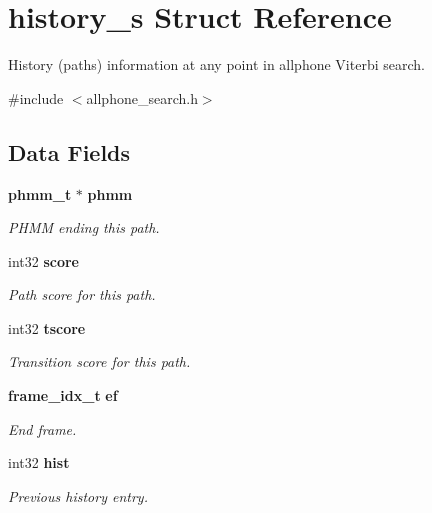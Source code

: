 \section{history\-\_\-s Struct Reference}
\label{structhistory__s}


History (paths) information at any point in allphone Viterbi search.  




{\ttfamily \#include $<$allphone\-\_\-search.\-h$>$}

\subsection*{Data Fields}
\begin{DoxyCompactItemize}
\item 
{\bf phmm\-\_\-t} $\ast$ {\bf phmm}\label{structhistory__s_a548a5d7505c78278114ab9b1d5e0ceaa}

\begin{DoxyCompactList}\small\item\em P\-H\-M\-M ending this path. \end{DoxyCompactList}\item 
int32 {\bf score}\label{structhistory__s_af24720abad5e2e17a99c5aeffa7dc95e}

\begin{DoxyCompactList}\small\item\em Path score for this path. \end{DoxyCompactList}\item 
int32 {\bf tscore}\label{structhistory__s_a09096eb94eba8ad29dc19f231192a24b}

\begin{DoxyCompactList}\small\item\em Transition score for this path. \end{DoxyCompactList}\item 
{\bf frame\-\_\-idx\-\_\-t} {\bf ef}\label{structhistory__s_a59e1a1053ba224c4d015f08192c7fd96}

\begin{DoxyCompactList}\small\item\em End frame. \end{DoxyCompactList}\item 
int32 {\bf hist}\label{structhistory__s_a0e9457246e140d8af571eea044178551}

\begin{DoxyCompactList}\small\item\em Previous history entry. \end{DoxyCompactList}\end{DoxyCompactItemize}


